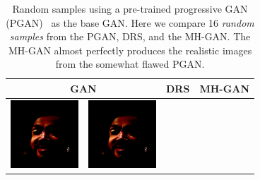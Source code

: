 \documentclass{article}
\newcommand{\pganw}{1.0in}
\begin{document}
\begin{table}[htbp]
\begin{center}
  \caption{{\small
    Random samples using a pre-trained progressive GAN (PGAN)~\citep{} as the base GAN\@.
    Here we compare 16 \emph{random samples} from the PGAN, DRS, and the MH-GAN\@.
    The MH-GAN almost perfectly produces the realistic images from the somewhat flawed PGAN\@.
    }}
  \label{tbl:pgan}
\setlength\tabcolsep{2pt} %
\begin{tabular}{cc|cc|cc}
\multicolumn{2}{c|}{GAN} & \multicolumn{2}{c|}{DRS} & \multicolumn{2}{c}{MH-GAN} \\
\toprule
\includegraphics[width=\pganw]{figures/pgan/0_base_raw_base.png} &
\includegraphics[width=\pganw]{figures/pgan/0_base_raw_base.png} &

\end{tabular}
\end{center}
\end{table}
\end{document}
